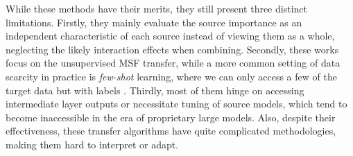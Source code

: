 \documentclass[letterpaper]{article} %
\begin{document}
While these methods have their merits, %
they still present three distinct limitations.
Firstly,
they mainly evaluate the source importance as an independent characteristic of each source instead of viewing them as a
whole,
neglecting the likely interaction effects when combining.
Secondly, these works
focus on the unsupervised MSF transfer,
while a more common setting of data scarcity in practice is \textit{few-shot} learning, where we can only access a few of the target data but with labels \citep{wang2020generalizing}. Thirdly, most of them hinge on accessing intermediate layer outputs or necessitate tuning of source models, which tend to become inaccessible in the era of proprietary large models. Also, despite their effectiveness, these transfer algorithms have quite complicated methodologies, making them hard to interpret or adapt. 

\end{document}
